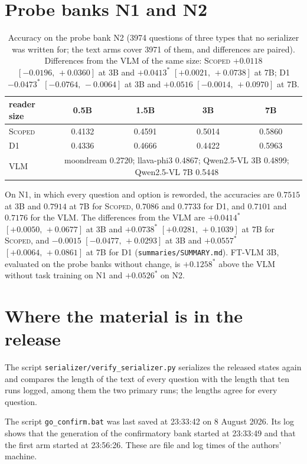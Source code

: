 \documentclass[10pt]{article}
\renewcommand{\thetable}{S\arabic{table}}
\newcommand{\settab}[1]{\setcounter{table}{#1}\addtocounter{table}{-1}\renewcommand{\thetable}{S\arabic{table}}}
\begin{document}
\section{Probe banks N1 and N2}
\settab{10}\begin{table}[h]\centering\footnotesize
\caption{Accuracy on the probe bank N2 (3974 questions of three types that no serializer was written for; the text arms cover 3971 of them, and differences are paired). Differences from the VLM of the same size: \textsc{Scoped} $+0.0118$ $[-0.0196,\,+0.0360]$ at 3B and $+0.0413^{*}$ $[+0.0021,\,+0.0738]$ at 7B; D1 $-0.0473^{*}$ $[-0.0764,\,-0.0064]$ at 3B and $+0.0516$ $[-0.0014,\,+0.0970]$ at 7B.}\label{tab:s10}
\begin{tabular}{@{}lcccc@{}}
\toprule reader size & 0.5B & 1.5B & 3B & 7B \\ \midrule
\textsc{Scoped} & 0.4132 & 0.4591 & 0.5014 & 0.5860 \\
D1 & 0.4336 & 0.4666 & 0.4422 & 0.5963 \\ \midrule
VLM & \multicolumn{4}{c}{moondream 0.2720; llava-phi3 0.4867; Qwen2.5-VL 3B 0.4899; Qwen2.5-VL 7B 0.5448} \\
\bottomrule
\end{tabular}
\end{table}
On N1, in which every question and option is reworded, the accuracies are $0.7515$ at 3B and $0.7914$ at 7B for \textsc{Scoped}, $0.7086$ and $0.7733$ for D1, and $0.7101$ and $0.7176$ for the VLM. The differences from the VLM are $+0.0414^{*}$ $[+0.0050,\,+0.0677]$ at 3B and $+0.0738^{*}$ $[+0.0281,\,+0.1039]$ at 7B for \textsc{Scoped}, and $-0.0015$ $[-0.0477,\,+0.0293]$ at 3B and $+0.0557^{*}$ $[+0.0064,\,+0.0861]$ at 7B for D1 (\texttt{summaries/SUMMARY.md}). FT-VLM 3B, evaluated on the probe banks without change, is $+0.1258^{*}$ above the VLM without task training on N1 and $+0.0526^{*}$ on N2.

\section{Where the material is in the release}
The script \texttt{serializer/verify\_serializer.py} serializes the released states again and compares the length of the text of every question with the length that ten runs logged, among them the two primary runs; the lengths agree for every question.

The script \texttt{go\_confirm.bat} was last saved at 23:33:42 on 8 August 2026. Its log shows that the generation of the confirmatory bank started at 23:33:49 and that the first arm started at 23:56:26. These are file and log times of the authors' machine.
\end{document}
